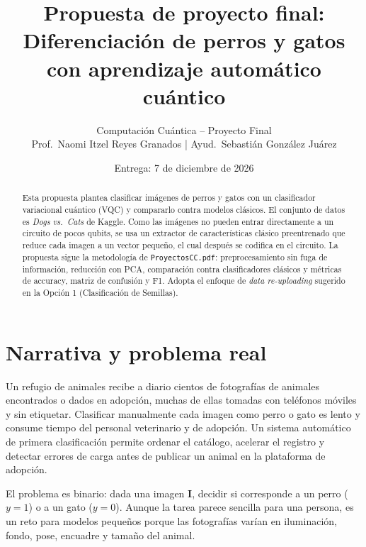 \documentclass[11pt,letterpaper]{article}
\title{\textbf{Propuesta de proyecto final:}\\[2pt]
Diferenciación de perros y gatos con aprendizaje automático cuántico}
\author{Computación Cuántica -- Proyecto Final\\
Prof.\ Naomi Itzel Reyes Granados \;\;|\;\; Ayud.\ Sebastián González Juárez}
\date{Entrega: 7 de diciembre de 2026}
\begin{document}
\maketitle

\begin{abstract}
\noindent Esta propuesta plantea clasificar imágenes de perros y gatos con un clasificador
variacional cuántico (VQC) y compararlo contra modelos clásicos. El conjunto de datos es
\emph{Dogs vs.\ Cats} de Kaggle. Como las imágenes no pueden entrar directamente a un circuito
de pocos qubits, se usa un extractor de características clásico preentrenado que reduce cada imagen
a un vector pequeño, el cual después se codifica en el circuito. La propuesta sigue la metodología de
\texttt{ProyectosCC.pdf}: preprocesamiento sin fuga de información, reducción con PCA, comparación
contra clasificadores clásicos y métricas de accuracy, matriz de confusión y F1. Adopta el enfoque de
\emph{data re-uploading} sugerido en la Opción 1 (Clasificación de Semillas).
\end{abstract}

\tableofcontents
\bigskip

\section{Narrativa y problema real}
Un refugio de animales recibe a diario cientos de fotografías de animales encontrados o dados en
adopción, muchas de ellas tomadas con teléfonos móviles y sin etiquetar. Clasificar manualmente
cada imagen como perro o gato es lento y consume tiempo del personal veterinario y de adopción. Un
sistema automático de primera clasificación permite ordenar el catálogo, acelerar el registro y
detectar errores de carga antes de publicar un animal en la plataforma de adopción.

El problema es binario: dada una imagen $\bm{I}$, decidir si corresponde a un perro ($y=1$) o a un
gato ($y=0$). Aunque la tarea parece sencilla para una persona, es un reto para modelos pequeños
porque las fotografías varían en iluminación, fondo, pose, encuadre y tamaño del animal.
\end{document}
